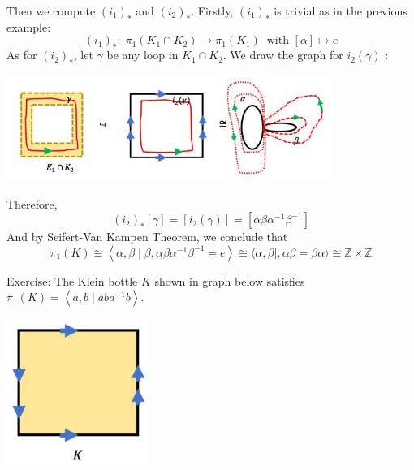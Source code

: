 \begin{example}
Then we compute \({\left( {i}_{1}\right) }_{ * }\) and \({\left( {i}_{2}\right) }_{ * }\). Firstly, \({\left( {i}_{1}\right) }_{ * }\) is trivial as in the previous example:
\[
{\left( {i}_{1}\right) }_{ * } : \;{\pi }_{1}\left( {{K}_{1} \cap  {K}_{2}}\right)  \rightarrow  {\pi }_{1}\left( {K}_{1}\right)
\ \text{ with }\left\lbrack  \alpha \right\rbrack   \mapsto  e
\]
As for \({\left( {i}_{2}\right) }_{ * }\), let \(\gamma\) be any loop in $K_1 \cap K_2$. We draw the graph for \({i}_{2}\left( \gamma \right)\) :
\begin{center}
\includegraphics[width=0.8\textwidth]{images/Ch9_K12_into_K2.jpg}
\end{center}
Therefore,
\[
{\left( {i}_{2}\right) }_{ * }\left\lbrack  \gamma \right\rbrack   = \left\lbrack  {{i}_{2}\left( \gamma \right) }\right\rbrack   = \left\lbrack  {{\alpha \beta }{\alpha }^{-1}{\beta }^{-1}}\right\rbrack
\]
And by Seifert-Van Kampen Theorem, we conclude that
\[
{\pi }_{1}\left( K\right)  \cong  \left\langle  {\alpha,\beta  \mid  \beta,{\alpha \beta }{\alpha }^{-1}{\beta }^{-1} = e}\right\rangle   \cong  \langle \alpha,\beta  \mid ,{\alpha \beta } = {\beta \alpha }\rangle  \cong  \mathbb{Z} \times  \mathbb{Z}
\]
\end{example}

Exercise: The Klein bottle \(K\) shown in graph below satisfies \({\pi }_{1}\left( K\right)  = \left\langle  {a,b \mid  {ab}{a}^{-1}b}\right\rangle\).
\begin{center}
\includegraphics[width=0.35\textwidth]{images/Ch9_Klein.jpg}
\end{center}

